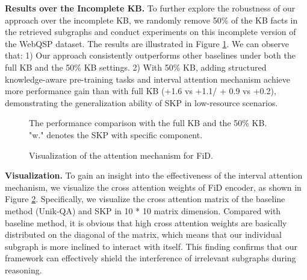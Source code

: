 \documentclass[sigconf,natbib=true,anonymous=False]{acmart}
\begin{document}
\textbf{Results over the Incomplete KB.} To further explore the robustness of our approach over the incomplete KB, we randomly remove 50\% of the KB facts in the retrieved subgraphs and conduct experiments on this incomplete version of the WebQSP dataset. The results are illustrated in Figure \ref{fig:50kb}. We can observe that: 1) Our approach consistently outperforms other baselines under both the full KB and the 50\% KB settings. 
2) With 50\% KB, adding structured knowledge-aware pre-training tasks and interval attention mechanism achieve more performance gain than with full KB (+1.6 vs +1.1/ + 0.9 vs +0.2), demonstrating the generalization ability of SKP in low-resource scenarios.
\begin{figure}[t]
\centering
{}
\vspace{-0.3cm} 
\caption{The performance comparison with the full KB and the 50\% KB. "w." denotes the SKP with specific component.}
\label{fig:50kb}
\vspace{-0.3cm} 
\end{figure}








\begin{figure}[t]
    \centering
    \vspace{-0.4cm}
    \caption{Visualization of the attention mechanism for FiD. }
    \label{fig:visual}
    \vspace{-0.2cm}
\end{figure}


\textbf{Visualization.} To gain an insight into the effectiveness of the interval attention mechanism, we visualize the cross attention weights of FiD encoder, as shown in Figure \ref{fig:visual}. Specifically, we visualize the cross attention matrix of the baseline method (Unik-QA) and SKP in 10 * 10 matrix dimension. Compared with baseline method, it is obvious that high cross attention weights are basically distributed on the diagonal of the matrix, which means that our individual subgraph is more inclined to interact with itself. This finding confirms that our framework can effectively shield the interference of irrelevant subgraphs during reasoning.
\end{document}
